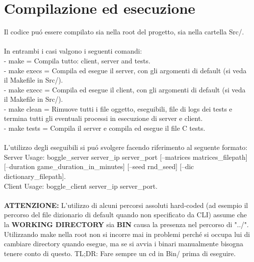\chapter{Compilazione ed esecuzione}

Il codice pu\'o essere compilato sia nella root del progetto, sia nella cartella Src/.
\\
\\
In entrambi i casi valgono i seguenti comandi:
\\
- make = Compila tutto: client, server and tests.
\\
- make execs = Compila ed esegue il server, con gli argomenti di default (si veda il Makefile in Src/).
\\
- make execc = Compila ed esegue il client, con gli argomenti di default (si veda il Makefile in Src/).
\\
- make clean = Rimuove tutti i file oggetto, eseguibili, file di logs dei tests e termina tutti gli eventuali processi in esecuzione di server e client.
\\
- make tests = Compila il server e compila ed esegue il file C tests.
\\
\\
L'utilizzo degli eseguibili si pu\'o svolgere facendo riferimento al seguente formato:
\\
Server Usage: boggle\_server server\_ip server\_port [--matrices matrices\_filepath] [--duration game\_duration\_in\_minutes] [--seed rnd\_seed] [--dic dictionary\_filepath].
\\
Client Usage: boggle\_client server\_ip server\_port.
\\
\\
\textbf{ATTENZIONE:} L'utilizzo di alcuni percorsi assoluti hard-coded (ad esempio il percorso del file dizionario di default quando non specificato da CLI) assume che la \textbf{WORKING DIRECTORY} sia  \textbf{BIN} causa la presenza nel percorso di "../". Utilizzando make nella root non si incorre mai in problemi perch\'e si occupa lui di cambiare directory quando esegue, ma se si avvia i binari manualmente bisogna tenere conto di questo. TL;DR: Fare sempre un cd in Bin/ prima di eseguire.

